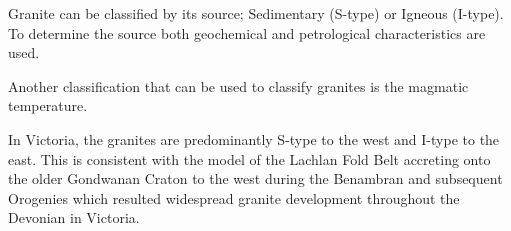 \documentclass[a4paper]{article}
\begin{document}
Granite can be classified by its source; Sedimentary (S-type) or Igneous (I-type). To determine the source both geochemical and petrological characteristics are used.

Another classification that can be used to classify granites is the magmatic temperature.

In Victoria, the granites are predominantly S-type to the west and I-type to the east. This is consistent with the model of the Lachlan Fold Belt accreting onto the older Gondwanan Craton to the west during the Benambran and subsequent Orogenies which resulted widespread granite development throughout the Devonian in Victoria.
\newpage



\end{document}
